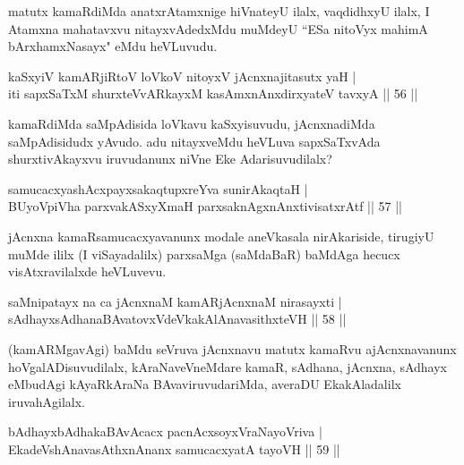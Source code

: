 \begin{artha}
matutx kamaRdiMda anatxrAtamxnige hiVnateyU ilalx, vaqdidhxyU ilalx, I Atamxna mahatavxvu nitayxvAdedxMdu muMdeyU ``ESa nitoVyx mahimA bArxhamxNasayx" eMdu heVLuvudu.
\end{artha}


\begin{shl}
kaSxyiV kamARjiRtoV loVkoV nitoyxV jAcnxnajitasutx yaH |\\
iti sapxSaTxM shurxteVvARkayxM kasAmxnAnx\s \s dirxyateV tavxyA \hfill || 56 ||
\end{shl}

\begin{artha}
kamaRdiMda saMpAdisida loVkavu kaSxyisuvudu, jAcnxnadiMda saMpAdisidudx yAvudo. 
adu nitayxveMdu heVLuva sapxSaTxvAda shurxtivAkayxvu iruvudanunx niVne Eke Adarisuvudilalx?
\end{artha}

\begin{shl}
samucacxyashAcxpayxsakaqtupxreYva sunirAkaqtaH |\\
BUyoV\s piVha parxvakASxyXmaH parxsaknAgxnAnxtivisatxrAtf \hfill || 57 ||
\end{shl}

\begin{artha}
jAcnxna kamaRsamucacxyavanunx  modale aneVkasala nirAkariside, tirugiyU muMde ililx (I viSayadalilx) parxsaMga (saMdaBaR) baMdAga hecucx visAtxravilalxde heVLuvevu.
\end{artha}


\begin{shl}
saMnipatayx na ca jAcnxnaM kamARjAcnxnaM nirasayxti |\\
sAdhayxsAdhanaBAvatovxVdeVkakAlAnavasithxteVH \hfill || 58 ||
\end{shl}

\begin{artha} 
(kamARMgavAgi) baMdu seVruva jAcnxnavu matutx kamaRvu ajAcnxnavanunx hoVgalADisuvudilalx, kAraNaveVneMdare kamaR, sAdhana, jAcnxna, sAdhayx eMbudAgi kAyaRkAraNa BAvaviruvudariMda, averaDU EkakAladalilx iruvahAgilalx.
\end{artha}


\begin{shl}
bAdhayxbAdhakaBAvAcacx pacnAcxsoyxVraNayoVriva |\\
EkadeVshAnavasAthxnAnanx samucacxyatA tayoVH \hfill || 59 ||
\end{shl}

